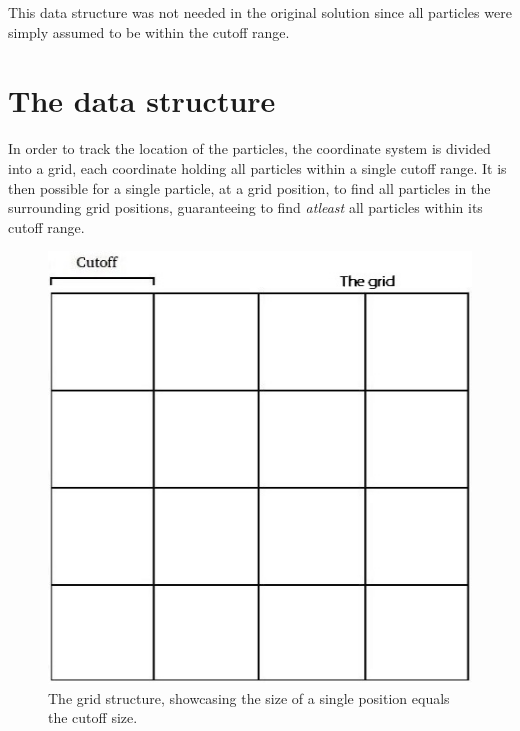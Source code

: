 \documentclass[a4paper,11pt,oneside]{book}
\begin{document}
This data structure was not needed in the original solution since all particles were simply assumed to be within the cutoff range.

\section{The data structure}
In order to track the location of the particles, the coordinate system is divided into a grid, each coordinate holding all particles within a single cutoff range. It is then possible for a single particle, at a grid position, to find all particles in the surrounding grid positions, guaranteeing to find \emph{atleast} all particles within its cutoff range.

\begin{figure}[H]
  \centering
  \begin{minipage}[b]{0.4\textwidth}
    \includegraphics[width=\textwidth]{grid.jpg}
    \caption{The grid structure, showcasing the size of a single position equals the cutoff size.}
  \end{minipage}
  \begin{minipage}[b]{0.4\textwidth}

\end{minipage}
\end{figure}
\end{document}
